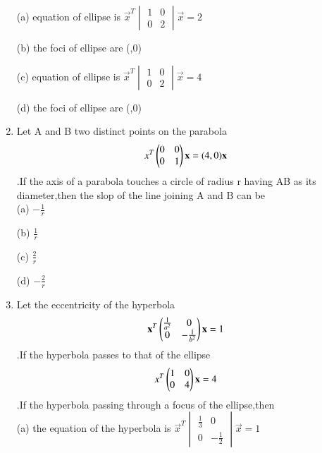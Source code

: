 \documentclass[journal,12pt,twocolumn]{IEEEtran}
\begin{document}
\begin{enumerate}
    \choice (a) equation of ellipse is $\vec x^T \begin{vmatrix}
    1& 0 \\0 & 2 \end{vmatrix} \vec x=2$
    
    \choice (b) the foci of ellipse are (,0)
    
    \choice (c) equation of ellipse is $\vec x^T \begin{vmatrix}
    1& 0 \\0 & 2 \end{vmatrix} \vec x=4$
    
    \choice (d) the foci of ellipse are (\pm {},0)\\
    
    \item Let A and B two distinct points on the parabola \begin{align} x^T \begin{pmatrix}0& 0 \\0 & 1\end{pmatrix} \mathbf x=(4,0)\mathbf x\end{align}.If the axis of a parabola touches a circle of radius r having AB as its diameter,then the slop of the line joining A and B can be \\
    
    \choice (a) $-\frac{1}{r}$
    
    \choice (b) $\frac{1}{r}$
    
    \choice (c) $\frac{2}{r}$
    
    \choice (d) $-\frac{2}{r}$\\ 
    
    \item Let the eccentricity of the hyperbola \begin{align}\mathbf x^T \begin{pmatrix}\frac{1}{a^2}& 0 \\0 & -\frac{1}{b^2}\end{pmatrix}\mathbf x=1\end{align}.If the hyperbola passes to that of the ellipse \begin{align}x^T \begin{pmatrix}1& 0 \\0 & 4 \end{pmatrix}\mathbf x=4\end{align}.If the hyperbola passing through a focus of the ellipse,then\\
    
    \choice (a) the equation of the hyperbola is $\vec x^T \begin{vmatrix}
    \frac{1}{3}& 0 \\0 & -\frac{1}{2} \end{vmatrix} \vec x=1$
    

\end{enumerate}
\end{document}
